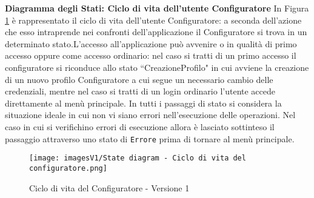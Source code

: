 \newpage
\textbf{Diagramma degli Stati: Ciclo di vita dell'utente Configuratore}\newline
In Figura \ref{fig:State diagram 1.1} è rappresentato il ciclo di vita dell'utente Configuratore: a seconda dell'azione che esso intraprende nei confronti dell'applicazione il Configuratore si trova in un determinato stato.\newline L'accesso all'applicazione può avvenire o in qualità di primo accesso oppure come accesso ordinario: nel caso si tratti di un primo accesso il configuratore si riconduce allo stato ``CreazioneProfilo" in cui avviene la creazione di un nuovo profilo Configuratore a cui segue un necessario cambio delle credenziali, mentre nel caso si tratti di un login ordinario l'utente accede direttamente al menù principale. \newline 
In tutti i passaggi di stato si considera la situazione ideale in cui non vi siano errori nell'esecuzione delle operazioni. Nel caso in cui si verifichino errori di esecuzione allora è lasciato sottinteso il passaggio attraverso uno stato di \texttt{Errore} prima di tornare al menù principale.

\begin{figure}[b!]
\centering
\texttt{[image: imagesV1/State diagram - Ciclo di vita del configuratore.png]}
\caption{\label{fig:State diagram 1.1}Ciclo di vita del Configuratore - Versione 1}
\end{figure}\bigskip